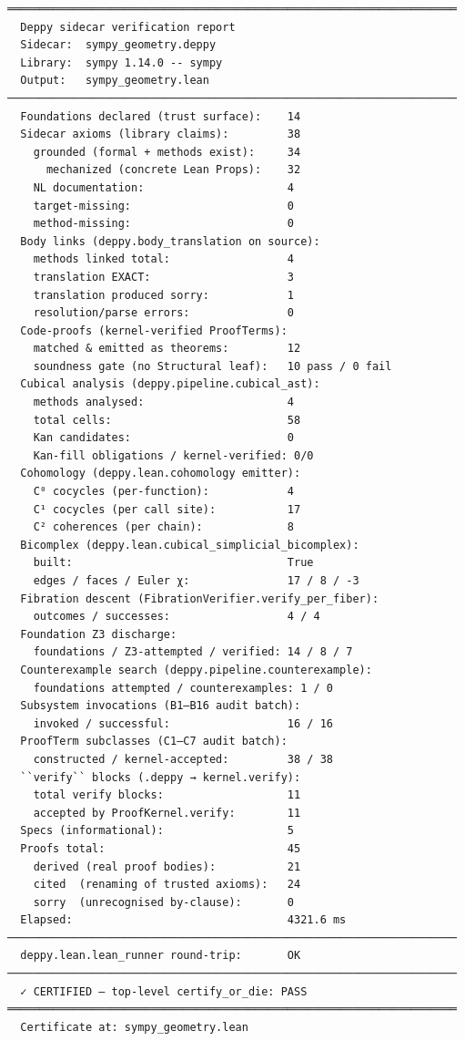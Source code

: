 \begin{lstlisting}
═════════════════════════════════════════════════════════════════════
  Deppy sidecar verification report
  Sidecar:  sympy_geometry.deppy
  Library:  sympy 1.14.0 -- sympy
  Output:   sympy_geometry.lean
─────────────────────────────────────────────────────────────────────
  Foundations declared (trust surface):    14
  Sidecar axioms (library claims):         38
    grounded (formal + methods exist):     34
      mechanized (concrete Lean Props):    32
    NL documentation:                      4
    target-missing:                        0
    method-missing:                        0
  Body links (deppy.body_translation on source):
    methods linked total:                  4
    translation EXACT:                     3
    translation produced sorry:            1
    resolution/parse errors:               0
  Code-proofs (kernel-verified ProofTerms):
    matched & emitted as theorems:         12
    soundness gate (no Structural leaf):   10 pass / 0 fail
  Cubical analysis (deppy.pipeline.cubical_ast):
    methods analysed:                      4
    total cells:                           58
    Kan candidates:                        0
    Kan-fill obligations / kernel-verified: 0/0
  Cohomology (deppy.lean.cohomology emitter):
    C⁰ cocycles (per-function):            4
    C¹ cocycles (per call site):           17
    C² coherences (per chain):             8
  Bicomplex (deppy.lean.cubical_simplicial_bicomplex):
    built:                                 True
    edges / faces / Euler χ:               17 / 8 / -3
  Fibration descent (FibrationVerifier.verify_per_fiber):
    outcomes / successes:                  4 / 4
  Foundation Z3 discharge:
    foundations / Z3-attempted / verified: 14 / 8 / 7
  Counterexample search (deppy.pipeline.counterexample):
    foundations attempted / counterexamples: 1 / 0
  Subsystem invocations (B1–B16 audit batch):
    invoked / successful:                  16 / 16
  ProofTerm subclasses (C1–C7 audit batch):
    constructed / kernel-accepted:         38 / 38
  ``verify`` blocks (.deppy → kernel.verify):
    total verify blocks:                   11
    accepted by ProofKernel.verify:        11
  Specs (informational):                   5
  Proofs total:                            45
    derived (real proof bodies):           21
    cited  (renaming of trusted axioms):   24
    sorry  (unrecognised by-clause):       0
  Elapsed:                                 4321.6 ms
─────────────────────────────────────────────────────────────────────
  deppy.lean.lean_runner round-trip:       OK
─────────────────────────────────────────────────────────────────────
  ✓ CERTIFIED — top-level certify_or_die: PASS
═════════════════════════════════════════════════════════════════════
  Certificate at: sympy_geometry.lean
\end{lstlisting}

